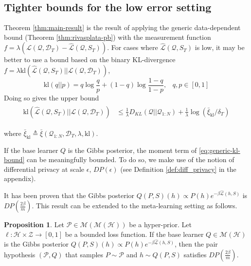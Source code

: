 \documentclass{article} %
\theoremstyle{definition}
\newtheorem{proposition}[theorem]{Proposition}
\begin{document}
\subsection{Tighter bounds for the low error setting}

Theorem \ref{thm:main-result} is the result of applying the generic data-dependent bound (Theorem \ref{thm:rivasplata-pb}) with the measurement function $f=\lambda(\mathcal{L}(\mathcal{Q},\mathcal{D}_T)-\hat{\mathcal{L}}(\mathcal{Q}, S_T))$. For cases where $\hat{\mathcal{L}}(\mathcal{Q}, S_T)$ is low, it may be better to use a bound based on the binary KL-divergence $f=\lambda \mathrm{kl}(\hat{\mathcal{L}}(\mathcal{Q}, S_T)||\mathcal{L}(\mathcal{Q},\mathcal{D}_T))$, 
$$
\mathrm{kl}(q||p)=q \log\frac{q}{p}+(1-q)\log\frac{1-q}{1-p},\;\;\; q,p\in[0, 1]
$$
Doing so gives the upper bound
    \begin{align} \label{eq:generic-kl-bound}
\begin{split}
\mathrm{kl}(\hat{\mathcal{L}}(\mathcal{Q}, S_T)||\mathcal{L}(\mathcal{Q},\mathcal{D}_T)) &\leq \frac{1}{\lambda} D_{KL}(\mathcal{Q}||\mathcal{Q}_{1:N})
+\frac{1}{\lambda}\log\left (\bar{\xi}_{\mathrm{kl}}/\delta_T\right ) 
\end{split}
\end{align}

where $\bar{\xi}_{\mathrm{kl}}\triangleq \bar{\xi}(\mathcal{Q}_{1:N}, \mathcal{D}_T,\lambda, \mathrm{kl}) .$

If the base learner $Q$ is the Gibbs posterior, the moment term of  \eqref{eq:generic-kl-bound} can be meaningfully bounded. To do so, we make use of the notion of differential privacy at scale $\epsilon$, $DP(\epsilon)$ (see Definition \ref{def:diff_privacy} in the appendix).

It has been proven \citep{McSherry2007, Rivasplata2020} that the Gibbs posterior $Q(P, S)(h)\propto P(h)e^{-\beta\hat{\mathcal{L}}(h, S)}$ is $DP\left (\frac{2\beta}{m}\right )$.
This result can be extended to the meta-learning setting as follows. 
%
\begin{proposition} \label{thm:pair-is-dp}
	Let $\mathcal{P}\in \mathcal{M}(\mathcal{M}(\mathcal{H}))$ be a hyper-prior.
	Let $\ell:\mathcal{H}\times \mathcal{Z}\rightarrow [0,1]$ be a bounded loss function. If the base learner $Q\in \mathcal{M}(\mathcal{H})$ is the Gibbs posterior $Q(P, S)(h)\propto P(h)e^{-\beta\hat{\mathcal{L}}(h, S)}$, 
	then the pair hypothesis $(\mathcal{P}, Q)$ that samples $P\sim\mathcal{P}$ and $h\sim Q(P, S)$ satisfies $DP\left (\frac{2\beta}{m}\right )$.
\end{proposition}
\end{document}
